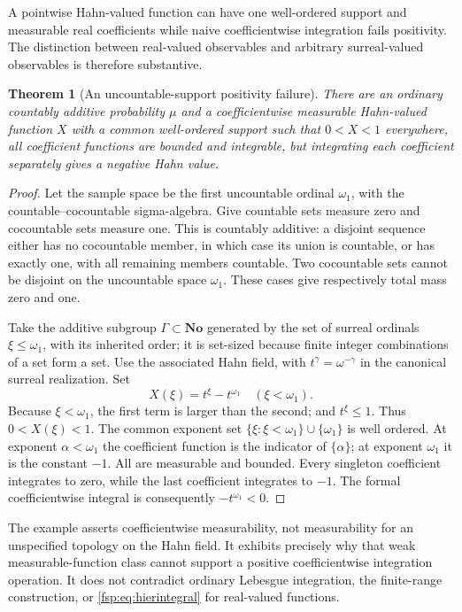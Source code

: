 \documentclass[11pt,a4paper]{article}
\numberwithin{equation}{section}
\newtheorem{theorem}{Theorem}[section]
\theoremstyle{definition}
\theoremstyle{remark}
\newcommand{\No}{\mathbf{No}}
\begin{document}
A pointwise Hahn-valued function can have one well-ordered support and
measurable real coefficients while naive coefficientwise integration
fails positivity. The distinction between real-valued observables and
arbitrary surreal-valued observables is therefore substantive.

\begin{theorem}[An uncountable-support positivity failure]
\label{fsp:thm:integrationfailure}
There are an ordinary countably additive probability $\mu$ and a
coefficientwise measurable Hahn-valued function $X$ with a common
well-ordered support such that $0<X<1$ everywhere, all coefficient
functions are bounded and integrable, but integrating each coefficient
separately gives a negative Hahn value.
\end{theorem}
\begin{proof}
Let the sample space be the first uncountable ordinal $\omega_1$, with
the countable--cocountable sigma-algebra. Give countable sets measure
zero and cocountable sets measure one. This is countably additive:
a disjoint sequence either has no cocountable member, in which case
its union is countable, or has exactly one, with all remaining members
countable. Two cocountable sets cannot be disjoint on the uncountable
space $\omega_1$. These cases give respectively total mass zero and one.

Take the additive subgroup $\Gamma\subset\No$ generated by the
set of surreal ordinals $\xi\le\omega_1$, with its inherited order;
it is set-sized because finite integer combinations of a set form a set.
Use the associated Hahn field, with $t^\gamma=\omega^{-\gamma}$
in the canonical surreal realization. Set
\begin{equation}\label{fsp:eq:badintegral}
 X(\xi)=t^\xi-t^{\omega_1}\quad(\xi<\omega_1).
\end{equation}
Because $\xi<\omega_1$, the first term is larger than the second;
and $t^\xi\le1$. Thus $0<X(\xi)<1$. The common exponent set
$\{\xi:\xi<\omega_1\}\cup\{\omega_1\}$ is well ordered.
At exponent $\alpha<\omega_1$ the coefficient function is the indicator
of $\{\alpha\}$; at exponent $\omega_1$ it is the constant $-1$.
All are measurable and bounded. Every singleton coefficient integrates
to zero, while the last coefficient integrates to $-1$. The formal
coefficientwise integral is consequently $-t^{\omega_1}<0$.
\end{proof}

The example asserts coefficientwise measurability, not measurability
for an unspecified topology on the Hahn field. It exhibits precisely
why that weak measurable-function class cannot support a positive
coefficientwise integration operation. It does not contradict ordinary
Lebesgue integration, the finite-range construction, or
\eqref{fsp:eq:hierintegral} for real-valued functions.
\end{document}
